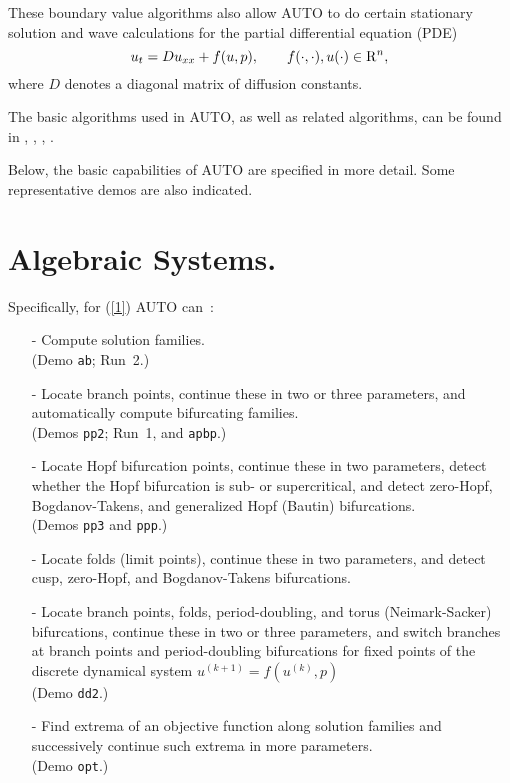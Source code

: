 \documentclass[12pt]{report}
\def\Rn{{\rm R}^n}
\begin{document}
These boundary value algorithms also allow {\cal AUTO} to do certain stationary 
solution and wave calculations for the partial differential equation (PDE)
\begin{equation} \label{3} 
  u_t = D u_{xx} + f( u , p ), 
  \qquad  f(\cdot,\cdot) , u(\cdot) \in \Rn,
\end{equation}
where $D$ denotes a diagonal matrix of diffusion constants.

The basic algorithms used in {\cal AUTO},
as well as related algorithms, can be found in 
 \citeyear{HBK:77},
 \citeyear{HBK:86},
 \citeyear{DoKeKe:91a},
 \citeyear{DoKeKe:91b}.

Below, the basic capabilities of {\cal AUTO} are specified in more detail.
Some representative demos are also indicated.
 
\section{ Algebraic Systems.} \label{sec:algebraic_systems}
Specifically, for (\ref{1}) {\cal AUTO} can~:~
 
\begin{itemize}
\item[-]
  Compute solution families.\\  (Demo {\tt ab}; Run~2.) 
\item[-]
  Locate branch points, continue these in two or three parameters,
  and automatically compute
  bifurcating families. \\ (Demos {\tt pp2}; Run~1, and {\tt apbp}.)
\item[-]
  Locate Hopf bifurcation points, continue these in two
  parameters, detect whether the Hopf bifurcation is sub- or
  supercritical, and detect zero-Hopf, Bogdanov-Takens, and 
  generalized Hopf (Bautin) bifurcations.\\ (Demos {\tt pp3} and
  {\tt ppp}.)
\item[-]
  Locate folds (limit points), continue these 
  in two parameters, and detect cusp, zero-Hopf, and Bogdanov-Takens
  bifurcations. \\
\item[-]
  Locate branch points, folds, period-doubling, and torus
  (Neimark-Sacker) bifurcations, continue these in two or three
  parameters, and switch branches at branch points and
  period-doubling bifurcations
  for fixed points of the discrete dynamical system
  $u^{(k+1)}= f( u^{(k)}, p )$ \\ (Demo {\tt dd2}.)
\item[-]
  Find extrema of an objective function along solution families
  and successively continue such extrema in more parameters.
  \\ (Demo {\tt opt}.)
\end{itemize}
\end{document}

